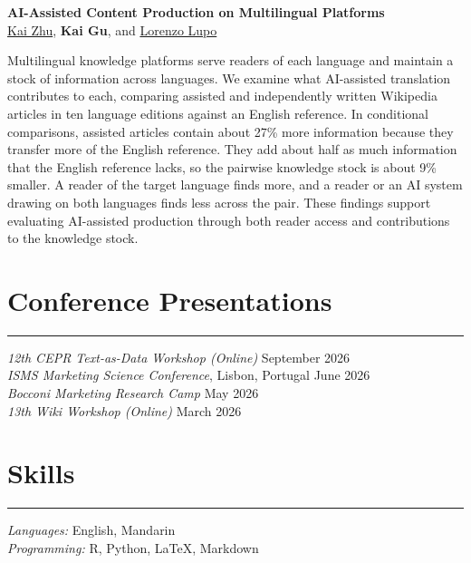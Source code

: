 \documentclass[a4paper,10pt]{article}
\begin{document}
\vspace{1em}

\textbf{AI-Assisted Content Production on Multilingual Platforms}\\
\href{https://kaizhu.me/}{Kai Zhu}, \textbf{Kai Gu}, and \href{https://lorelupo.github.io/}{Lorenzo Lupo}

{\small Multilingual knowledge platforms serve readers of each language and maintain a stock of information across languages. We examine what AI-assisted translation contributes to each, comparing assisted and independently written Wikipedia articles in ten language editions against an English reference. In conditional comparisons, assisted articles contain about 27\% more information because they transfer more of the English reference. They add about half as much information that the English reference lacks, so the pairwise knowledge stock is about 9\% smaller. A reader of the target language finds more, and a reader or an AI system drawing on both languages finds less across the pair. These findings support evaluating AI-assisted production through both reader access and contributions to the knowledge stock.}

\section*{Conference Presentations}
\hrule
\vspace{2pt}
\textit{12th CEPR Text-as-Data Workshop (Online)} \hfill September 2026 \\
\textit{ISMS Marketing Science Conference}, Lisbon, Portugal \hfill June 2026 \\
\textit{Bocconi Marketing Research Camp} \hfill May 2026 \\
\textit{13th Wiki Workshop (Online)} \hfill March 2026

\section*{Skills}
\hrule
\vspace{2pt}
\textit{Languages:} English, Mandarin \\
\textit{Programming:} R, Python, \LaTeX, Markdown
\end{document}
